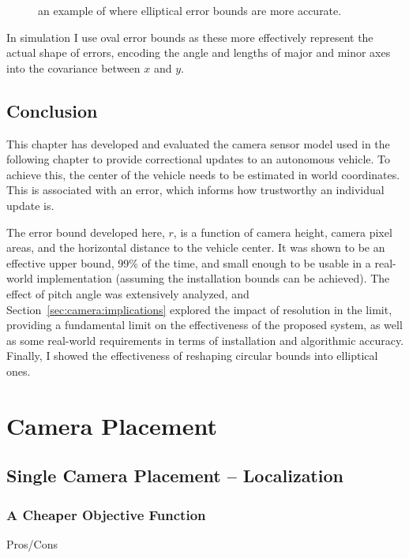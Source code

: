 \documentclass[a4paper,12pt,twoside,openright]{report}
\begin{document}
\begin{figure}[htb]
    \begin{center}
        
    \end{center}
    \caption[elliptical versus circular error]{an example of where elliptical error bounds are more accurate.}
    \label{fig:camera:oval better}
\end{figure}


In simulation I use oval error bounds as these more effectively represent the 
actual shape of errors, encoding the angle and lengths of major
and minor axes into the covariance between $x$ and $y$.

\section{Conclusion}

This chapter has developed and evaluated the camera sensor model
used in the following chapter to provide correctional updates
to an autonomous vehicle. To achieve this, the center
of the vehicle needs to be estimated in world coordinates. This
is associated with an error, which informs how trustworthy
an individual update is.

The error bound developed here, $r$, is a function of camera height,
camera pixel areas, and the horizontal distance to the vehicle center.
It was shown to be an effective upper bound, 99\% of the time, and
small enough to be usable in a real-world implementation (assuming
the installation bounds can be achieved). The effect of pitch angle
was extensively analyzed, and Section~\ref{sec:camera:implications}
explored the impact of resolution in the limit, providing a 
fundamental limit on the effectiveness of the proposed system,
as well as some real-world requirements in terms of
installation and algorithmic accuracy. Finally, I showed
the effectiveness of reshaping circular bounds into elliptical ones.


\chapter{Camera Placement}
\label{chap:cameraplacement}


\section{Single Camera Placement -- Localization}

\subsection{A Cheaper Objective Function}
Pros/Cons
\end{document}
